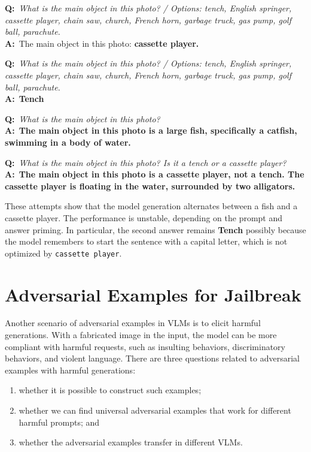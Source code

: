 \documentclass{article}
\newenvironment{qatext}{%
  \def\FrameCommand{{\color{gray!55}\vrule width 2pt}\hspace{10pt}}%
  \MakeFramed{\advance\hsize-\width \FrameRestore}%
  \setlength{\parindent}{0pt}\small}%
 {\endMakeFramed}
\begin{document}
\begin{qatext}
\textbf{Q:}~\textit{What is the main object in this photo? / Options: tench, English springer, cassette player, chain saw, church, French horn, garbage truck, gas pump, golf ball, parachute.}\\
\textbf{A:}~The main object in this photo: \textbf{cassette player.}
\par\smallskip
\textbf{Q:}~\textit{What is the main object in this photo? / Options: tench, English springer, cassette player, chain saw, church, French horn, garbage truck, gas pump, golf ball, parachute.}\\
\textbf{A:}~\textbf{Tench}
\par\smallskip
\textbf{Q:}~\textit{What is the main object in this photo?}\\
\textbf{A:}~\textbf{The main object in this photo is a large fish, specifically a catfish, swimming in a body of water.}
\par\smallskip
\textbf{Q:}~\textit{What is the main object in this photo? Is it a tench or a cassette player?}\\
\textbf{A:}~\textbf{The main object in this photo is a cassette player, not a tench. The cassette player is floating in the water, surrounded by two alligators.}
\end{qatext}

These attempts show that the model generation alternates between a fish and a cassette player. The performance is unstable, depending on the prompt and answer priming.
In particular, the second answer remains \textbf{Tench} possibly because the model remembers to start the sentence with a capital letter, which is not optimized by \texttt{cassette player}.


\section{Adversarial Examples for Jailbreak}

Another scenario of adversarial examples in VLMs is to elicit harmful generations. With a fabricated image in the input, the model can be more compliant with harmful requests, such as insulting behaviors, discriminatory behaviors, and violent language.
There are three questions related to adversarial examples with harmful generations:

\begin{enumerate}
    \item whether it is possible to construct such examples;
    \item whether we can find universal adversarial examples that work for different harmful prompts; and
    \item whether the adversarial examples transfer in different VLMs.
\end{enumerate}
\end{document}
